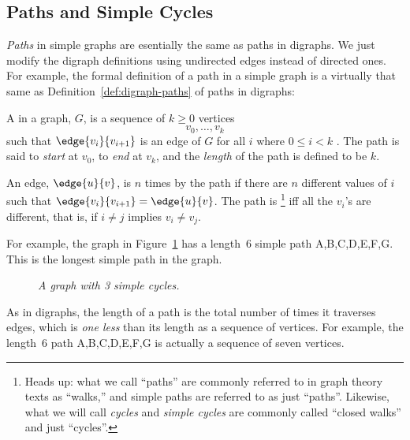 

\subsection{Paths and Simple Cycles}

\emph{Paths} in simple graphs are esentially the same as paths in digraphs.
We just modify the digraph definitions using undirected edges instead of directed
ones.  For example, the formal definition of a path in a simple graph is a virtually
that same as Definition~\ref{def:digraph-paths} of paths in digraphs:

\begin{definition}\label{def:undirected-path}
A  in a graph, $G$, is a sequence of $k \geq 0$ vertices
\[
v_0,\dots,v_k
\]
such that $\edge{v_i}{v_{i+1}}$ is an edge of $G$ for all $i$ where $0
\leq i < k$ .  The path is said to \emph{start} at
$v_0$, to \emph{end} at $v_k$, and the \emph{length} of the path is defined to be $k$.

An edge, $\edge{u}{v}$, is  $n$ times by the path if there
are $n$ different values of $i$ such that $\edge{v_i}{v_{i+1}} =
\edge{u}{v}$.  The path is \footnote{Heads up: what we call
  ``paths'' are commonly referred to in graph theory texts as ``walks,'' and simple
  paths are referred to as just ``paths''.  Likewise, what we will call \emph{cycles}
  and \emph{simple cycles} are commonly called ``closed walks'' and just ``cycles''.}
  iff all the $v_i$'s are different, that is, if $i\neq j$ implies $v_i \neq v_j$.
\end{definition}

For example, the graph in Figure~\ref{dg} has a length~6 simple path
A,B,C,D,E,F,G.  This is the longest simple path in the graph.
\begin{figure}[htbp] 
\caption{\em A graph with 3 simple cycles.}
\label{dg}
\end{figure}

As in digraphs, the length of a path is the total number of times it traverses edges,
which is \emph{one less} than its length as a sequence of vertices.  For example, the
length~6 path A,B,C,D,E,F,G is actually a sequence of seven vertices.

